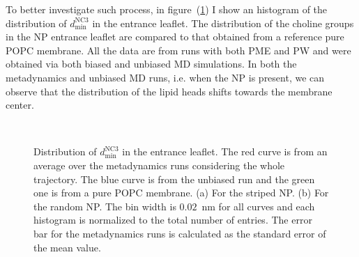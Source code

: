 To better investigate such process, in figure~(\ref{fig:NC3minDist}) I show an histogram of the distribution of 
$d_\text{min}^{\text{NC}3}$ in the entrance leaflet. The distribution of the choline groups in the \ac{NP} 
entrance leaflet are compared to that obtained from a reference pure \ac{POPC} membrane. All the data are from 
runs with both \ac{PME} and \ac{PW} and were obtained via both biased and unbiased \ac{MD} simulations. In both 
the metadynamics and unbiased \ac{MD} runs, i.e. when the \ac{NP} is present, we can observe that the distribution 
of the lipid heads shifts towards the membrane center.
\begin{figure}[th!]
	\center
	\\%
	\caption{Distribution of $d_\text{min}^{\text{NC}3}$ in the entrance leaflet. The red curve is from an average over the metadynamics runs considering the whole trajectory. The blue curve is from the unbiased run and the green one is from a pure \acs{POPC} membrane. (a) For the striped \acs{NP}. (b) For the random \acs{NP}. The bin width is $0.02$~nm for all curves and each histogram is normalized to the total number of entries. The error bar for the metadynamics runs is calculated as the standard error of the mean value.}%
	\label{fig:NC3minDist}
\end{figure}

